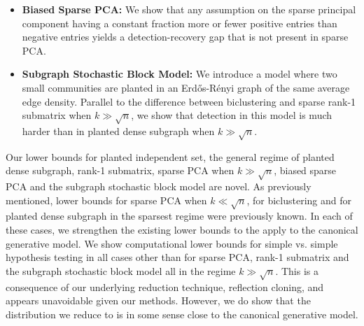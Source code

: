 \begin{itemize}
\item \textbf{Biased Sparse PCA:} We show that any assumption on the sparse principal component having a constant fraction more or fewer positive entries than negative entries yields a detection-recovery gap that is not present in sparse PCA. 
\item \textbf{Subgraph Stochastic Block Model:} We introduce a model where two small communities are planted in an Erd\H{o}s-R\'{e}nyi graph of the same average edge density. Parallel to the difference between biclustering and sparse rank-1 submatrix when $k \gg \sqrt{n}$, we show that detection in this model is much harder than in planted dense subgraph when $k \gg \sqrt{n}$.
\end{itemize}
Our lower bounds for planted independent set, the general regime of planted dense subgraph, rank-1 submatrix, sparse PCA when $k \gg \sqrt{n}$, biased sparse PCA and the subgraph stochastic block model are novel. As previously mentioned, lower bounds for sparse PCA when $k \ll \sqrt{n}$, for biclustering and for planted dense subgraph in the sparsest regime were previously known. In each of these cases, we strengthen the existing lower bounds to the apply to the canonical generative model. We show computational lower bounds for simple vs. simple hypothesis testing in all cases other than for sparse PCA, rank-1 submatrix and the subgraph stochastic block model all in the regime $k \gg \sqrt{n}$. This is a consequence of our underlying reduction technique, reflection cloning, and appears unavoidable given our methods. However, we do show that the distribution we reduce to is in some sense close to the canonical generative model.

